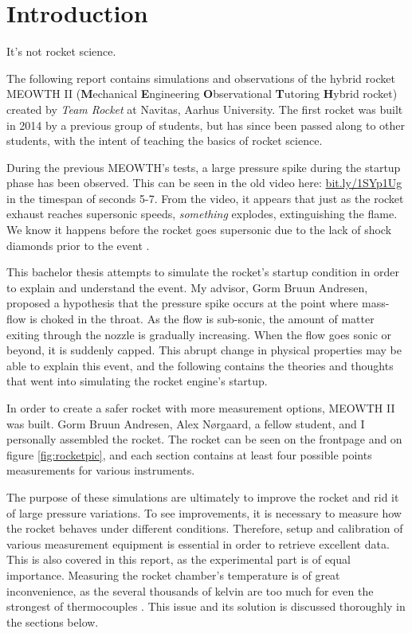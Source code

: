 \chapter{Introduction}

It's not rocket science.

The following report contains simulations and observations of the hybrid rocket MEOWTH II (\textbf{M}echanical \textbf{E}ngineering \textbf{O}bservational \textbf{T}utoring \textbf{H}ybrid rocket) created by \emph{Team Rocket} \cite{bulba} at Navitas, Aarhus University. The first rocket was built in 2014 by a previous group of students, but has since been passed along to other students, with the intent of teaching the basics of rocket science.


During the previous MEOWTH's tests, a large pressure spike during the startup phase has been observed. This can be seen in the old video here: \url{bit.ly/1SYp1Ug} in the timespan of seconds 5-7. From the video, it appears that just as the rocket exhaust reaches supersonic speeds, \emph{something} explodes, extinguishing the flame. We know it happens before the rocket goes supersonic due to the lack of shock diamonds prior to the event \cite[chapter 18, p.~643]{rockProp}.


This bachelor thesis attempts to simulate the rocket's startup condition in order to explain and understand the event. My advisor, Gorm Bruun Andresen, proposed a hypothesis that the pressure spike occurs at the point where mass-flow is choked in the throat. As the flow is sub-sonic, the amount of matter exiting through the nozzle is gradually increasing. When the flow goes sonic or beyond, it is suddenly capped. This abrupt change in physical properties may be able to explain this event, and the following contains the theories and thoughts that went into simulating the rocket engine's startup.


In order to create a safer rocket with more measurement options, MEOWTH II was built. Gorm Bruun Andresen, Alex Nørgaard, a fellow student, and I personally assembled the rocket. The rocket can be seen on the frontpage and on figure \ref{fig:rocketpic}, and each section contains at least four possible points measurements for various instruments.


The purpose of these simulations are ultimately to improve the rocket and rid it of large pressure variations. To see improvements, it is necessary to measure how the rocket behaves under different conditions. Therefore, setup and calibration of various measurement equipment is essential in order to retrieve excellent data. This is also covered in this report, as the experimental part is of equal importance. Measuring the rocket chamber's temperature is of great inconvenience, as the several thousands of kelvin are too much for even the strongest of thermocouples \cite{thermocoup}. This issue and its solution is discussed thoroughly in the sections below.

